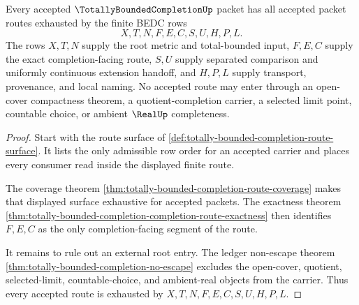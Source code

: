 \begin{theorem}
\label{thm:totally-bounded-completion-root-route-exhaustion}
Every accepted $\TotallyBoundedCompletionUp$ packet has all accepted packet routes exhausted by the finite BEDC rows
$$
X,T,N,F,E,C,S,U,H,P,L .
$$
The rows $X,T,N$ supply the root metric and total-bounded input, $F,E,C$ supply the exact completion-facing route, $S,U$ supply separated comparison and uniformly continuous extension handoff, and $H,P,L$ supply transport, provenance, and local naming. No accepted route may enter through an open-cover compactness theorem, a quotient-completion carrier, a selected limit point, countable choice, or ambient $\RealUp$ completeness.
\end{theorem}
\begin{proof}
Start with the route surface of \autoref{def:totally-bounded-completion-route-surface}. It lists the only admissible row order for an accepted carrier and places every consumer read inside the displayed finite route.

The coverage theorem \autoref{thm:totally-bounded-completion-route-coverage} makes that displayed surface exhaustive for accepted packets. The exactness theorem \autoref{thm:totally-bounded-completion-completion-route-exactness} then identifies $F,E,C$ as the only completion-facing segment of the route.

It remains to rule out an external root entry. The ledger non-escape theorem \autoref{thm:totally-bounded-completion-no-escape} excludes the open-cover, quotient, selected-limit, countable-choice, and ambient-real objects from the carrier. Thus every accepted route is exhausted by $X,T,N,F,E,C,S,U,H,P,L$.
\end{proof}


